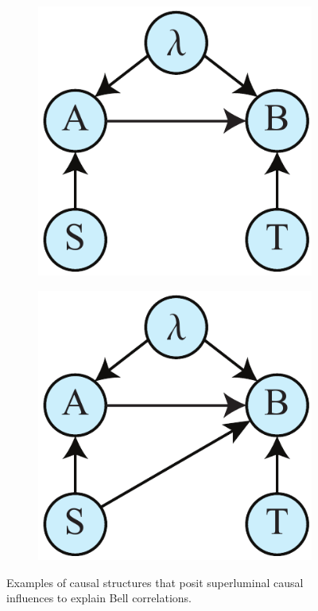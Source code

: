 \documentclass[12pt,onecolumn,nofootinbib]{revtex4-2}
\begin{document}
\begin{figure}[h]
\begin{subfigure}[b]{0.18\textwidth}
        	\includegraphics[width=\textwidth]{bell-superlum-2}
             	\subcaption{}
                	\label{fig:bell-AtoB}
        \end{subfigure}
        \hspace{5em}
                \begin{subfigure}[b]{0.18\textwidth}
                	\centering
        	\includegraphics[width=\textwidth]{bell-superlum}
             	\subcaption{}
                	\label{fig:bell-SAtoB}
        \end{subfigure}
 \caption{Examples of causal structures that posit superluminal causal influences to explain Bell correlations.}
\label{fig:bell-SandAtoB}
\end{figure}
\end{document}
